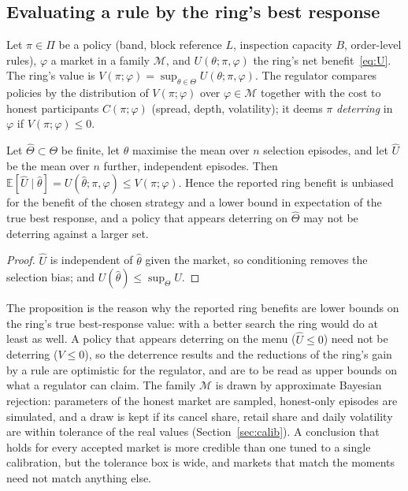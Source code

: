 \subsection{Evaluating a rule by the ring's best response}\label{sec:br}

Let $\pi\in\Pi$ be a policy (band, block reference $L$, inspection capacity $B$, order-level rules), $\varphi$ a market in a family $\mathcal M$, and $U(\theta;\pi,\varphi)$ the ring's net benefit~\eqref{eq:U}. The ring's value is $V(\pi;\varphi)=\sup_{\theta\in\Theta}U(\theta;\pi,\varphi)$. The regulator compares policies by the distribution of $V(\pi;\varphi)$ over $\varphi\in\mathcal M$ together with the cost to honest participants $C(\pi;\varphi)$ (spread, depth, volatility); it deems $\pi$ \emph{deterring} in $\varphi$ if $V(\pi;\varphi)\le0$.

\begin{proposition}\label{prop:lower}
Let $\hat\Theta\subset\Theta$ be finite, let $\hat\theta$ maximise the mean over $n$ selection episodes, and let $\hat U$ be the mean over $n$ further, independent episodes. Then $\mathbb E[\hat U\mid\hat\theta]=U(\hat\theta;\pi,\varphi)\le V(\pi;\varphi)$. Hence the reported ring benefit is unbiased for the benefit of the chosen strategy and a lower bound in expectation of the true best response, and a policy that appears deterring on $\hat\Theta$ may not be deterring against a larger set.
\end{proposition}
\begin{proof}
$\hat U$ is independent of $\hat\theta$ given the market, so conditioning removes the selection bias; and $U(\hat\theta)\le\sup_\Theta U$. \qedhere
\end{proof}

The proposition is the reason why the reported ring benefits are lower bounds on the ring's true best-response value: with a better search the ring would do at least as well. A policy that appears deterring on the menu ($\hat U\le0$) need not be deterring ($V\le0$), so the deterrence results and the reductions of the ring's gain by a rule are optimistic for the regulator, and are to be read as upper bounds on what a regulator can claim. The family $\mathcal M$ is drawn by approximate Bayesian rejection: parameters of the honest market are sampled, honest-only episodes are simulated, and a draw is kept if its cancel share, retail share and daily volatility are within tolerance of the real values (Section~\ref{sec:calib}). A conclusion that holds for every accepted market is more credible than one tuned to a single calibration, but the tolerance box is wide, and markets that match the moments need not match anything else.
